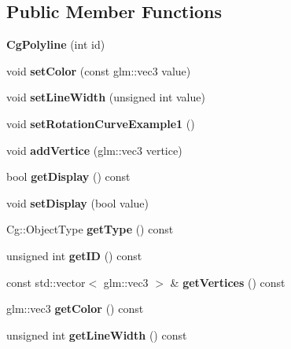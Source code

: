 \subsection*{Public Member Functions}
\begin{DoxyCompactItemize}
\item 
\mbox{\label{class_cg_polyline_a55e81a83ae00173431c8c2cf9784c950}} 
{\bfseries Cg\+Polyline} (int id)
\item 
\mbox{\label{class_cg_polyline_a271cfa5c2c17c9c9f42ef9bc191a52a8}} 
void {\bfseries set\+Color} (const glm\+::vec3 value)
\item 
\mbox{\label{class_cg_polyline_af4fbeb4776b0b20268dce3a78c655da3}} 
void {\bfseries set\+Line\+Width} (unsigned int value)
\item 
\mbox{\label{class_cg_polyline_a769032aa5f5b8efcdcebc563f9bc4ebd}} 
void {\bfseries set\+Rotation\+Curve\+Example1} ()
\item 
\mbox{\label{class_cg_polyline_a2a689f9f1a9f8c1565004514479973ce}} 
void {\bfseries add\+Vertice} (glm\+::vec3 vertice)
\item 
\mbox{\label{class_cg_polyline_a36b93b19e72a47e9eb497e17618dcb6a}} 
bool {\bfseries get\+Display} () const
\item 
\mbox{\label{class_cg_polyline_aaae0548c1e6c2fc8867898fb8c978dae}} 
void {\bfseries set\+Display} (bool value)
\item 
\mbox{\label{class_cg_polyline_af8587c83f1cfaa64aa449fec535a2d1d}} 
Cg\+::\+Object\+Type {\bfseries get\+Type} () const
\item 
\mbox{\label{class_cg_polyline_ae72c48d98b0636c3ca79f35436aaa8e4}} 
unsigned int {\bfseries get\+ID} () const
\item 
\mbox{\label{class_cg_polyline_a5c556245522c9b9fb23330a2b8170ef8}} 
const std\+::vector$<$ glm\+::vec3 $>$ \& {\bfseries get\+Vertices} () const
\item 
\mbox{\label{class_cg_polyline_a9bd531ec6ff42ba9c9d4e817170a267b}} 
glm\+::vec3 {\bfseries get\+Color} () const
\item 
\mbox{\label{class_cg_polyline_a8fe71d5aed4cca9baeed4418afea0101}} 
unsigned int {\bfseries get\+Line\+Width} () const
\end{DoxyCompactItemize}
